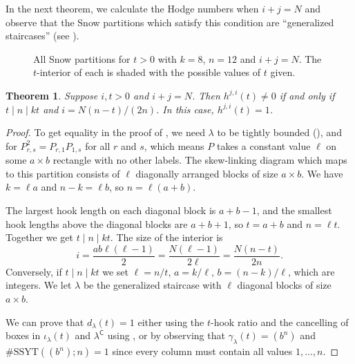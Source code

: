 \documentclass{amsart}
\newcommand\C{\mathsf{C}}
\newcommand\SSYT{\mathrm{SSYT}}
\theoremstyle{plain}
\newtheorem{theorem}{Theorem}[section]
\theoremstyle{definition}
\numberwithin{equation}{section}
\begin{document}
In the next theorem, we calculate the Hodge numbers when $i+j=N$ and observe that the Snow partitions which satisfy this condition are ``generalized staircases'' (see ).

\begin{figure}[H]
\begin{center}
\quad
{}\quad
{}
\end{center}
\caption{All Snow partitions for $t>0$ with $k=8$, $n=12$ and $i+j=N$. The $t$-interior of each is shaded with the possible values of $t$ given.}
\label{fig:i+j=N}
\end{figure}


\begin{theorem}\label{thm:i+j=N}
Suppose $i,t>0$ and $i+j=N$. Then $h^{j,i}(t)\neq 0$ if and only if $t\mid n\mid kt$ and $i=N(n-t)/(2n)$. In this case, $h^{j,i}(t)=1$.
\end{theorem}
\begin{proof}
To get equality in the proof of , we need $\lambda$ to be tightly bounded (), and for $P_{r,s}^2=P_{r,1}P_{1,s}$ for all $r$ and $s$, which means $P$ takes a constant value $\ell$ on some $a\times b$ rectangle with no other labels. The skew-linking diagram which maps to this partition consists of $\ell$ diagonally arranged blocks of size $a\times b$. We have $k=\ell a$ and $n-k=\ell b$, so $n=\ell(a+b)$.

The largest hook length on each diagonal block is $a+b-1$, and the smallest hook lengths above the diagonal blocks are $a+b+1$, so $t=a+b$ and $n=\ell t$. Together we get $t\mid n\mid kt$. The size of the interior is
\[i=\frac{ab\ell(\ell-1)}{2}=\frac{N(\ell-1)}{2\ell}=\frac{N(n-t)}{2n}.\]
Conversely, if $t\mid n\mid kt$ we set $\ell=n/t$, $a=k/\ell$, $b=(n-k)/\ell$, which are integers. We let $\lambda$ be the generalized staircase with $\ell$ diagonal blocks of size $a\times b$.

We can prove that $d_\lambda(t)=1$ either using the $t$-hook ratio and the cancelling of boxes in $\iota_\lambda(t)$ and $\lambda^\C$ using , or by observing that $\gamma_\lambda(t)=(b^n)$ and $\#\SSYT((b^n);n)=1$ since every column must contain all values $1,\dots,n$.
\end{proof}
\end{document}
